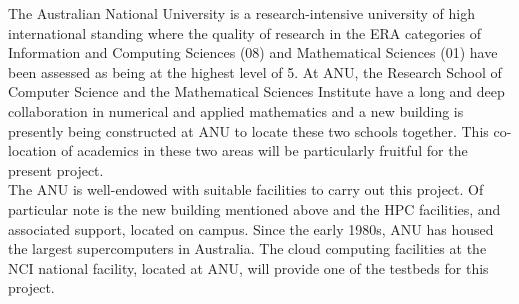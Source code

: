 The Australian National University is a research-intensive university
of high international standing where the quality of research in the ERA categories of 
 Information and Computing
Sciences (08) and Mathematical Sciences (01) have been assessed as
being at the highest level of 5. At ANU, the Research School of
Computer Science and the Mathematical Sciences Institute have a long
and deep collaboration in numerical and applied mathematics and a new building is presently being constructed at ANU to
locate these two schools together. This co-location of academics in these two
areas will be particularly fruitful for the present project.\\


The ANU is well-endowed with suitable facilities to carry out this project. Of particular note is the new building mentioned above and the HPC facilities, and associated support, located on campus.
Since the early 1980s, ANU has housed the
largest supercomputers in Australia. The cloud computing facilities at the NCI national
facility, located at ANU, will provide one of the testbeds for this
project.





